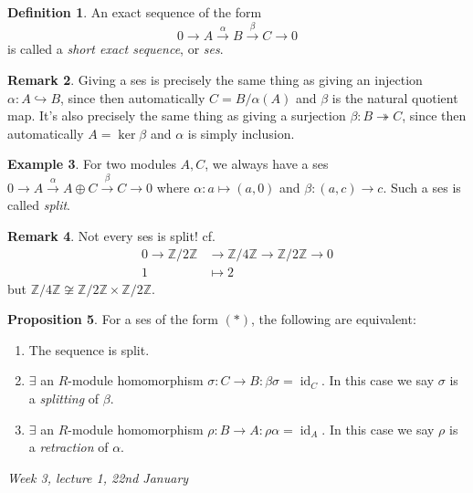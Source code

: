 \documentclass{article}
\newcommand{\Z}{\mathbb{Z}}
\newcommand{\id}{\operatorname{id}}
\theoremstyle{definition}
\newtheorem{defn}{Definition}[subsection]
\newtheorem{prop}[defn]{Proposition}
\newtheorem{example}[defn]{Example}
\newtheorem{remark}[defn]{Remark}
\begin{document}
\begin{defn}
An exact sequence of the form
\[
\tag{\ast}
0\rightarrow A\xrightarrow{\alpha} B\xrightarrow{\beta} C\rightarrow 0
\]
is called a \textit{short exact sequence}, or \textit{ses}.
\end{defn}

\begin{remark}
Giving a ses is precisely the same thing as giving an injection $\alpha:A\hookrightarrow B$, since then automatically $C=B/\alpha(A)$ and $\beta$ is the natural quotient map. It's also precisely the same thing as giving a surjection $\beta:B\twoheadrightarrow C$, since then automatically $A=\ker\beta$ and $\alpha$ is simply inclusion.
\end{remark}

\begin{example}
For two modules $A,C$, we always have a ses $0\rightarrow A\xrightarrow{\alpha}A\oplus C\xrightarrow{\beta}C\rightarrow 0$ where $\alpha:a\mapsto (a,0)$ and $\beta:(a,c)\rightarrow c$. Such a ses is called \textit{split}.
\end{example}

\begin{remark}
Not every ses is split! cf.
\[
\begin{aligned}
0\rightarrow\Z/2\Z&\rightarrow\Z/4\Z\rightarrow\Z/2\Z\rightarrow 0 \\
1&\mapsto 2
\end{aligned}
\]
but $\Z/4\Z\not\cong\Z/2\Z\times\Z/2\Z$.
\end{remark}

\begin{prop}
For a ses of the form $(\ast)$, the following are equivalent:
\begin{enumerate}
\item The sequence is split.
\item $\exists$ an $R$-module homomorphism $\sigma:C\rightarrow B:\beta\sigma=\id_C$. In this case we say $\sigma$ is a \textit{splitting} of $\beta$.
\item $\exists$ an $R$-module homomorphism $\rho:B\rightarrow A:\rho\alpha=\id_A$. In this case we say $\rho$ is a \textit{retraction} of $\alpha$.
\end{enumerate}
\end{prop}

\begin{flushright}
\textit{Week 3, lecture 1, 22nd January}
\end{flushright}
\end{document}
